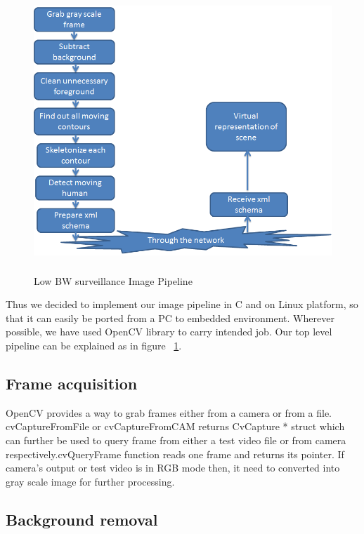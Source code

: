 \begin{figure}[!t]
\centering
\includegraphics[height=300pt]{Figures/image_pipeline}
\caption{Low BW surveillance Image Pipeline}
\label{image_pipeline}
\end{figure}

Thus we decided to implement our image pipeline in C and on Linux
platform, so that it can easily be ported from a PC to embedded
environment. Wherever possible, we have used OpenCV library to carry
intended job. Our top level pipeline can be explained as in figure
~\ref{image_pipeline}.\\

\subsection{Frame acquisition}

OpenCV provides a way to grab frames either from a camera or from a
file. cvCaptureFromFile or cvCaptureFromCAM returns CvCapture * struct
which can further be used to query frame from either a test video file
or from camera respectively.cvQueryFrame function reads one frame and
returns its pointer. If camera's output or test video is in RGB mode
then, it need to converted into gray scale image for further processing.

\subsection{Background removal}

